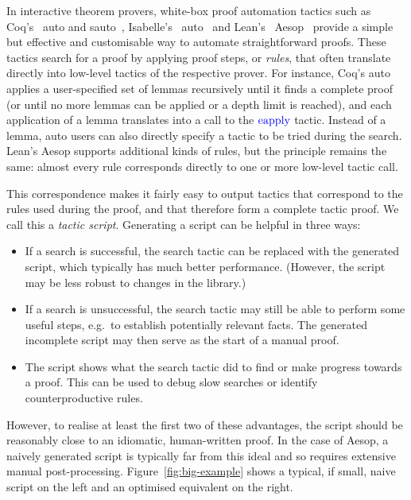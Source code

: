 \documentclass[sigplan,10pt,anonymous,review]{acmart}
\newcommand{\tac}[1]{\ensuremath{\mathrm{\mathcolor{blue}{#1}}}}
\begin{document}
In interactive theorem provers, white-box proof automation tactics such as Coq's~\cite{Coq} auto and sauto~\cite{sauto}, Isabelle's~\cite{Isabelle} auto~\cite{IsabelleAuto} and Lean's~\cite{Lean4} Aesop~\cite{Aesop} provide a simple but effective and customisable way to automate straightforward proofs.
These tactics search for a proof by applying proof steps, or \emph{rules}, that often translate directly into low-level tactics of the respective prover.
For instance, Coq's auto applies a user-specified set of lemmas recursively until it finds a complete proof (or until no more lemmas can be applied or a depth limit is reached), and each application of a lemma translates into a call to the \tac{eapply} tactic.
Instead of a lemma, auto users can also directly specify a tactic to be tried during the search.
Lean's Aesop supports additional kinds of rules, but the principle remains the same: almost every rule corresponds directly to one or more low-level tactic call.

This correspondence makes it fairly easy to output tactics that correspond to the rules used during the proof, and that therefore form a complete tactic proof.
We call this a \emph{tactic script}.
Generating a script can be helpful in three ways:
\begin{itemize}
  \item If a search is successful, the search tactic can be replaced with the generated script, which typically has much better performance.
        (However, the script may be less robust to changes in the library.)
  \item If a search is unsuccessful, the search tactic may still be able to perform some useful steps, e.g.\ to establish potentially relevant facts.
        The generated incomplete script may then serve as the start of a manual proof.
  \item The script shows what the search tactic did to find or make progress towards a proof.
        This can be used to debug slow searches or identify counterproductive rules.
\end{itemize}

However, to realise at least the first two of these advantages, the script should be reasonably close to an idiomatic, human-written proof.
In the case of Aesop, a naively generated script is typically far from this ideal and so requires extensive manual post-processing.
Figure~\ref{fig:big-example} shows a typical, if small, naive script on the left and an optimised equivalent on the right.
\end{document}

